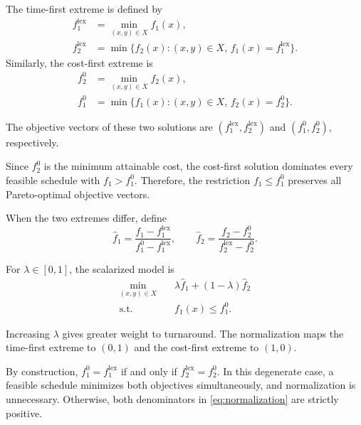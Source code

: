 \documentclass[conference]{IEEEtran}
\begin{document}
The time-first extreme is defined by
\begin{align}
f_1^{\mathrm{lex}}
&=\min_{(x,y)\in X}f_1(x),\\
f_2^{\mathrm{lex}}
&=\min\bigl\{
f_2(x):(x,y)\in X,\,
f_1(x)=f_1^{\mathrm{lex}}
\bigr\}.
\end{align}
Similarly, the cost-first extreme is
\begin{align}
f_2^0
&=\min_{(x,y)\in X}f_2(x),\\
f_1^0
&=\min\bigl\{
f_1(x):(x,y)\in X,\,
f_2(x)=f_2^0
\bigr\}.
\end{align}

The objective vectors of these two solutions are
$(f_1^{\mathrm{lex}},f_2^{\mathrm{lex}})$
and $(f_1^0,f_2^0)$, respectively.

Since $f_2^0$ is the minimum attainable cost,
the cost-first solution dominates every feasible schedule
with $f_1>f_1^0$. Therefore, the restriction
$f_1\leq f_1^0$ preserves all Pareto-optimal
objective vectors.

When the two extremes differ, define
\begin{equation}
\label{eq:normalization}
\widehat f_1
=\frac{f_1-f_1^{\mathrm{lex}}}
{f_1^0-f_1^{\mathrm{lex}}},
\qquad
\widehat f_2
=\frac{f_2-f_2^0}
{f_2^{\mathrm{lex}}-f_2^0}.
\end{equation}

For $\lambda\in[0,1]$, the scalarized model is
\begin{equation}
\label{eq:scalarization}
\begin{aligned}
\min_{(x,y)\in X}\quad&
\lambda\widehat f_1+(1-\lambda)\widehat f_2\\
\text{s.t.}\quad&
f_1(x)\leq f_1^0.
\end{aligned}
\end{equation}

Increasing $\lambda$ gives greater weight to turnaround.
The normalization maps the time-first extreme to
$(0,1)$ and the cost-first extreme to $(1,0)$.

By construction,
$f_1^0=f_1^{\mathrm{lex}}$ if and only if
$f_2^{\mathrm{lex}}=f_2^0$.
In this degenerate case, a feasible schedule minimizes
both objectives simultaneously, and normalization is
unnecessary. Otherwise, both denominators in
\eqref{eq:normalization} are strictly positive.
\end{document}
